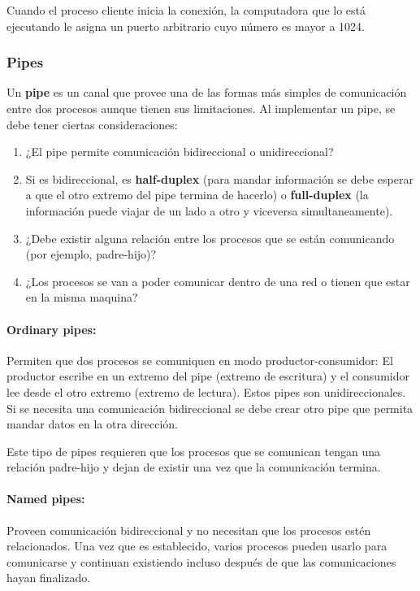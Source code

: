 Cuando el proceso cliente inicia la conexión, la computadora que lo está ejecutando le asigna un puerto arbitrario cuyo número es mayor a 1024.
\subsubsection{Pipes}
Un \textbf{pipe} es un canal que provee una de las formas más simples de comunicación entre dos procesos aunque tienen sus limitaciones. Al implementar un pipe, se debe tener ciertas consideraciones: 
\begin{enumerate}
    \item ¿El pipe permite comunicación bidireccional o unidireccional?
    \item Si es bidireccional, es \textbf{half-duplex} (para mandar información se debe esperar a que el otro extremo del pipe termina de hacerlo) o \textbf{full-duplex} (la información puede viajar de un lado a otro y viceversa simultaneamente).
    \item ¿Debe existir alguna relación entre los procesos que se están comunicando (por ejemplo, padre-hijo)?
    \item ¿Los procesos se van a poder comunicar dentro de una red o tienen que estar en la misma maquina?
\end{enumerate}

\paragraph{Ordinary pipes:} Permiten que dos procesos se comuniquen en modo productor-consumidor: El productor escribe en un extremo del pipe (extremo de escritura) y el consumidor lee desde el otro extremo (extremo de lectura). Estos pipes son unidireccionales. Si se necesita una comunicación bidireccional se debe crear otro pipe que permita mandar datos en la otra dirección.

Este tipo de pipes requieren que los procesos que se comunican tengan una relación padre-hijo y dejan de existir una vez que la comunicación termina.

\paragraph{Named pipes:} Proveen comunicación bidireccional y no necesitan que los procesos estén relacionados. Una vez que es establecido, varios procesos pueden usarlo para comunicarse y continuan existiendo incluso después de que las comunicaciones hayan finalizado.

